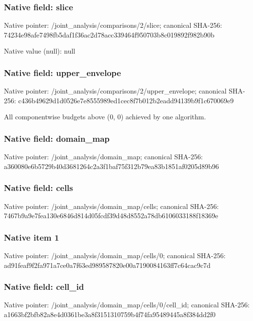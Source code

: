 \documentclass[10pt,a4paper]{article}
\begin{document}
\subsubsection{Native field: slice}
Native pointer: /joint\_\allowbreak{}analysis/comparisons/2/slice; canonical SHA-256: 74234e98afe7498fb5daf1f36ac2d78acc339464f950703b8c019892f982b90b

Native value (null): null

\subsubsection{Native field: upper\_\allowbreak{}envelope}
Native pointer: /joint\_\allowbreak{}analysis/comparisons/2/upper\_\allowbreak{}envelope; canonical SHA-256: c436b49629d1d0526e7e8555989ed1cec8f7b012b2eadd94139b9f1c670069e9

\begingroup\raggedright\sloppy All componentwise budgets above (0,\allowbreak{} 0) achieved by one algorithm.\par\endgroup

\subsubsection{Native field: domain\_\allowbreak{}map}
Native pointer: /joint\_\allowbreak{}analysis/domain\_\allowbreak{}map; canonical SHA-256: a360080e6b5729b40d3681264c2a3f1baf75f312b79ea83b1851af0205d89b96

\subsubsection{Native field: cells}
Native pointer: /joint\_\allowbreak{}analysis/domain\_\allowbreak{}map/cells; canonical SHA-256: 7467b9a9e7fea130e6846d814d05fcdf39d48d8552a78db6106033188f18369e

\subsubsection{Native item 1}
Native pointer: /joint\_\allowbreak{}analysis/domain\_\allowbreak{}map/cells/0; canonical SHA-256: ad91feaf9f2fa971a7ce0a7f63ed989587820e00a7190084163ff7c64cac9c7d

\subsubsection{Native field: cell\_\allowbreak{}id}
Native pointer: /joint\_\allowbreak{}analysis/domain\_\allowbreak{}map/cells/0/cell\_\allowbreak{}id; canonical SHA-256: a1663bf2bfb82a8e4d0361be3a8f3151310759b4f74fa95489445a8f384dd2f0
\end{document}
